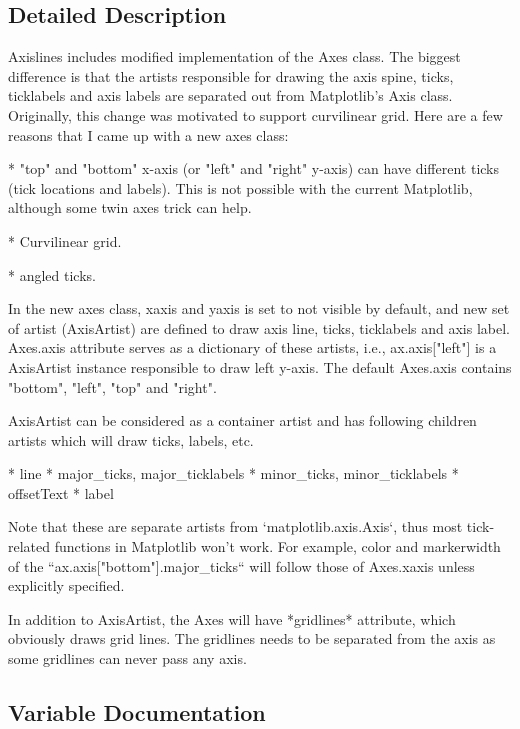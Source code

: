 \subsection{Detailed Description}
\begin{DoxyVerb}Axislines includes modified implementation of the Axes class. The
biggest difference is that the artists responsible for drawing the axis spine,
ticks, ticklabels and axis labels are separated out from Matplotlib's Axis
class. Originally, this change was motivated to support curvilinear
grid. Here are a few reasons that I came up with a new axes class:

* "top" and "bottom" x-axis (or "left" and "right" y-axis) can have
  different ticks (tick locations and labels). This is not possible
  with the current Matplotlib, although some twin axes trick can help.

* Curvilinear grid.

* angled ticks.

In the new axes class, xaxis and yaxis is set to not visible by
default, and new set of artist (AxisArtist) are defined to draw axis
line, ticks, ticklabels and axis label. Axes.axis attribute serves as
a dictionary of these artists, i.e., ax.axis["left"] is a AxisArtist
instance responsible to draw left y-axis. The default Axes.axis contains
"bottom", "left", "top" and "right".

AxisArtist can be considered as a container artist and
has following children artists which will draw ticks, labels, etc.

* line
* major_ticks, major_ticklabels
* minor_ticks, minor_ticklabels
* offsetText
* label

Note that these are separate artists from `matplotlib.axis.Axis`, thus most
tick-related functions in Matplotlib won't work. For example, color and
markerwidth of the ``ax.axis["bottom"].major_ticks`` will follow those of
Axes.xaxis unless explicitly specified.

In addition to AxisArtist, the Axes will have *gridlines* attribute,
which obviously draws grid lines. The gridlines needs to be separated
from the axis as some gridlines can never pass any axis.
\end{DoxyVerb}
 

\subsection{Variable Documentation}
\mbox{\label{namespaceaxisartist_1_1axislines_ae7bdfebb18ec851f930dd0f32cb803eb}} 
